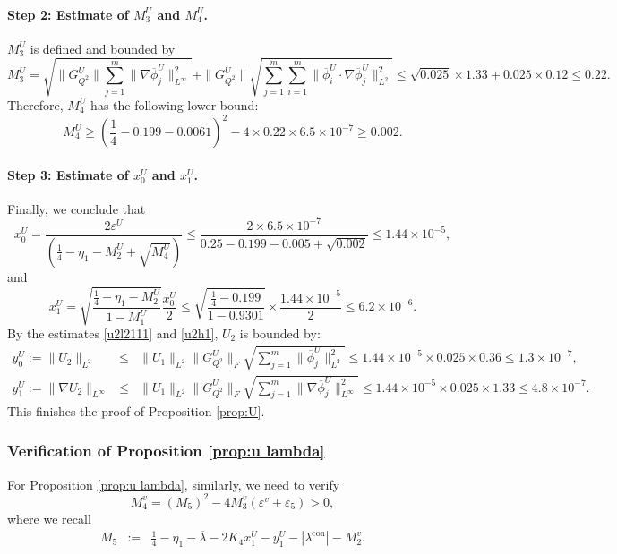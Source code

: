 \documentclass[11pt,a4paper]{article}
\numberwithin{equation}{section}
\newcommand{\assign}{:=}
\newcommand{\cdummy}{\cdot}
\newcommand{\tmop}[1]{\ensuremath{\operatorname{#1}}}
\begin{document}
\paragraph{Step 2: Estimate of $M_3^U$ and $M_4^U$.}

$M_3^U$ is defined and bounded by
\[ M_3^U =  \sqrt{ \| G^U_{Q^2} \|\sum_{j = 1}^m \| \nabla \overline{\phi}_j^U
   \|_{L^\infty}^2} + \| G^U_{Q^2} \| \sqrt{\sum_{j = 1}^m \sum_{i = 1}^m \|
   \overline{\phi}_i^U \cdummy \nabla \overline{\phi}_j^U \|_{L^2}^2}  \leqslant \sqrt{0.025} \times 1.33 + 0.025 \times 0.12 \leqslant 0.22.
\]
Therefore, $M_4^U$ has the following lower bound:
\[ M_4^U \geqslant (\frac{1}{4} - 0.199 - 0.0061)^2 - 4 \times 0.22 \times 6.5
   \times 10^{- 7} \geqslant 0.002. \]

\paragraph{Step 3: Estimate of $x_0^U$ and $x_1^U$.}

Finally, we conclude that
\[ x_0^U = \frac{2 \varepsilon^U}{\left( \frac{1}{4} - \eta_1 - M_2^U +
   \sqrt{M_4^U} \right)} \leqslant \frac{2 \times 6.5 \times 10^{- 7}}{0.25 -
   0.199 - 0.005 + \sqrt{0.002}} \leqslant 1.44 \times 10^{- 5}, \]
and
\[ x_1^U = \sqrt{\frac{\frac{1}{4} - \eta_1 - M_2^U}{1 - M_1^U}} 
   \frac{x_0^U}{2} \leqslant \sqrt{\frac{\frac{1}{4} - 0.199}{1 - 0.9301}}
   \times \frac{1.44 \times 10^{- 5}}{2} \leqslant 6.2 \times 10^{- 6} . \]
   By the estimates \eqref{u2l2111} and \eqref{u2h1}, $U_2$ is bounded by:
\begin{eqnarray*}
     y_0^U\assign\| U_2 \|_{L^2} & \leqslant & \| U_1 \|_{L^2} \| G_{Q^2}^U \|_F \sqrt{\sum_{j
    = 1}^m \| \overline{\phi}_j^U \|_{L^2}^2}  \leqslant 1.44 \times 10^{- 5} \times 0.025 \times 0.36 \leqslant 1.3 \times 10^{-7} ,\\
    y_1^U\assign\| \nabla U_2 \|_{L^\infty} & \leqslant & \| U_1 \|_{L^2} \| G_{Q^2}^U \|_F \sqrt{\sum_{j
    = 1}^m \| \nabla \overline{\phi}_j^U \|_{L^\infty}^2}  \leqslant 1.44 \times 10^{- 5} \times 0.025 \times 1.33 \leqslant 4.8 \times 10^{-7}  .
\end{eqnarray*}
This finishes the proof of Proposition \ref{prop:U}.

\subsubsection{Verification of Proposition \ref{prop:u lambda}}

For Proposition \ref{prop:u lambda}, similarly, we need to verify
\[ M_4^v = (M_5)^2 - 4 M_3^v (\varepsilon^v+\varepsilon_{5}) > 0, \]
where we recall
\begin{eqnarray*}
  M_5 & \assign & \frac{1}{4} - \eta_1 - \overline{\lambda} - 2 K_4 x^U_1 - y^U_1 - | \lambda^{\tmop{con}} | - M_2^v .
\end{eqnarray*}
\end{document}
